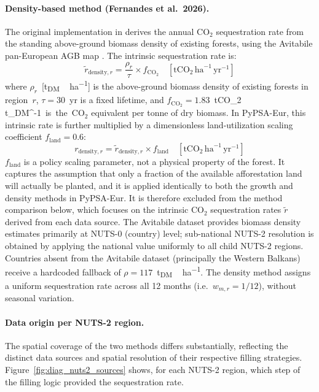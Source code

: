 \documentclass[12pt, a4paper]{article}
\begin{document}
\paragraph{Density-based method (Fernandes et al.\ 2026).}
The original implementation in \citet{Fernandes2026} derives the annual CO$_2$ sequestration rate from the standing above-ground biomass density of existing forests, using the Avitabile pan-European AGB map \citep{Avitabile2024}. The intrinsic sequestration rate is:
\begin{equation}
    \tilde{r}_{\text{density}, r}
    = \frac{\rho_r}{\tau} \times f_{\text{CO}_2}
    \quad [\text{tCO}_2\,\text{ha}^{-1}\,\text{yr}^{-1}]
    \label{eq:density_rate_intrinsic}
\end{equation}
where $\rho_r$~[\si{t_{DM}\,ha^{-1}}] is the above-ground biomass density of existing forests in region~$r$, $\tau = 30$~yr is a fixed lifetime, and $f_{\text{CO}_2} = 1.83$~\si{tCO_2\,t_{DM}^{-1}} is the CO$_2$ equivalent per tonne of dry biomass. In PyPSA-Eur, this intrinsic rate is further multiplied by a dimensionless land-utilization scaling coefficient $f_{\text{land}} = 0.6$:
\begin{equation}
    r_{\text{density}, r}
    = \tilde{r}_{\text{density}, r} \times f_{\text{land}}
    \quad [\text{tCO}_2\,\text{ha}^{-1}\,\text{yr}^{-1}]
    \label{eq:density_rate}
\end{equation}
$f_{\text{land}}$ is a policy scaling parameter, not a physical property of the forest. It captures the assumption that only a fraction of the available afforestation land will actually be planted, and it is applied identically to both the growth and density methods in PyPSA-Eur. It is therefore excluded from the method comparison below, which focuses on the intrinsic CO$_2$ sequestration rates $\tilde{r}$ derived from each data source. The Avitabile dataset provides biomass density estimates primarily at NUTS-0 (country) level; sub-national NUTS-2 resolution is obtained by applying the national value uniformly to all child NUTS-2 regions. Countries absent from the Avitabile dataset (principally the Western Balkans) receive a hardcoded fallback of $\rho = 117$~\si{t_{DM}\,ha^{-1}}. The density method assigns a uniform sequestration rate across all 12 months (i.e.\ $w_{m,r} = 1/12$), without seasonal variation.

\paragraph{Data origin per NUTS-2 region.}
The spatial coverage of the two methods differs substantially, reflecting the distinct data sources and spatial resolution of their respective filling strategies.
Figure~\ref{fig:diag_nuts2_sources} shows, for each NUTS-2 region, which step of the filling logic provided the sequestration rate.
\end{document}
